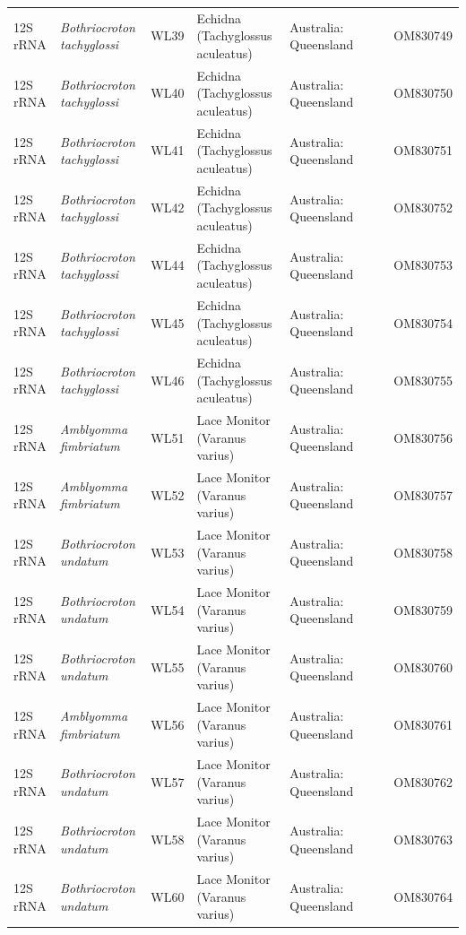 \documentclass[a4paper, nobind]{templates/ociamthesis}
\begin{document}
\begin{landscape}
\begin{longtable}[t]{l>{}lllllll}
12S rRNA & \em{Bothriocroton tachyglossi} & WL39 & Echidna (Tachyglossus aculeatus) & Australia: Queensland &  &  & OM830749\\
12S rRNA & \em{Bothriocroton tachyglossi} & WL40 & Echidna (Tachyglossus aculeatus) & Australia: Queensland &  &  & OM830750\\
12S rRNA & \em{Bothriocroton tachyglossi} & WL41 & Echidna (Tachyglossus aculeatus) & Australia: Queensland &  &  & OM830751\\
12S rRNA & \em{Bothriocroton tachyglossi} & WL42 & Echidna (Tachyglossus aculeatus) & Australia: Queensland &  &  & OM830752\\
12S rRNA & \em{Bothriocroton tachyglossi} & WL44 & Echidna (Tachyglossus aculeatus) & Australia: Queensland &  &  & OM830753\\
12S rRNA & \em{Bothriocroton tachyglossi} & WL45 & Echidna (Tachyglossus aculeatus) & Australia: Queensland &  &  & OM830754\\
12S rRNA & \em{Bothriocroton tachyglossi} & WL46 & Echidna (Tachyglossus aculeatus) & Australia: Queensland &  &  & OM830755\\
12S rRNA & \em{Amblyomma fimbriatum} & WL51 & Lace Monitor (Varanus varius) & Australia: Queensland &  &  & OM830756\\
12S rRNA & \em{Amblyomma fimbriatum} & WL52 & Lace Monitor (Varanus varius) & Australia: Queensland &  &  & OM830757\\
12S rRNA & \em{Bothriocroton undatum} & WL53 & Lace Monitor (Varanus varius) & Australia: Queensland &  &  & OM830758\\
12S rRNA & \em{Bothriocroton undatum} & WL54 & Lace Monitor (Varanus varius) & Australia: Queensland &  &  & OM830759\\
12S rRNA & \em{Bothriocroton undatum} & WL55 & Lace Monitor (Varanus varius) & Australia: Queensland &  &  & OM830760\\
12S rRNA & \em{Amblyomma fimbriatum} & WL56 & Lace Monitor (Varanus varius) & Australia: Queensland &  &  & OM830761\\
12S rRNA & \em{Bothriocroton undatum} & WL57 & Lace Monitor (Varanus varius) & Australia: Queensland &  &  & OM830762\\
12S rRNA & \em{Bothriocroton undatum} & WL58 & Lace Monitor (Varanus varius) & Australia: Queensland &  &  & OM830763\\
12S rRNA & \em{Bothriocroton undatum} & WL60 & Lace Monitor (Varanus varius) & Australia: Queensland &  &  & OM830764\\

\end{longtable}
\end{landscape}
\end{document}
